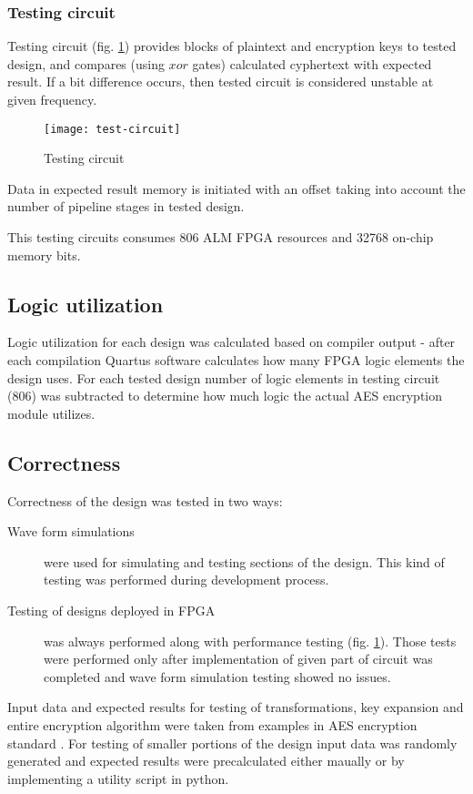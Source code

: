 \subsubsection{Testing circuit}
Testing circuit (fig. \ref{fig:test-circuit}) provides blocks of plaintext and encryption keys to tested design, and compares (using $xor$ gates) calculated cyphertext with expected result. If a bit difference occurs, then tested circuit is considered unstable at given frequency.

\begin{figure}[!h]
\centering
\texttt{[image: test-circuit]}
\caption{Testing circuit}
\label{fig:test-circuit}
\end{figure}

Data in expected result memory is initiated with an offset taking into account the number of pipeline stages in tested design.

This testing circuits consumes 806 ALM FPGA resources and 32768 on-chip memory bits.



\subsection{Logic utilization}
Logic utilization for each design was calculated based on compiler output - after each compilation Quartus software calculates how many FPGA logic elements the design uses. For each tested design number of logic elements in testing circuit (806) was subtracted to determine how much logic the actual AES encryption module utilizes.



\subsection{Correctness}
Correctness of the design was tested in two ways:
\begin{description}
\item[Wave form simulations] were used for simulating and testing sections of the design. This kind of testing was performed during development process.
\item[Testing of designs deployed in FPGA] was always performed along with performance testing (fig. \ref{fig:test-circuit}). Those tests were performed only after implementation of given part of circuit was completed and wave form simulation testing showed no issues.
\end{description}

Input data and expected results for testing of transformations, key expansion and entire encryption algorithm were taken from examples in AES encryption standard \cite{aes-standard}. For testing of smaller portions of the design input data was randomly generated and expected results were precalculated either maually or by implementing a utility script in python.
